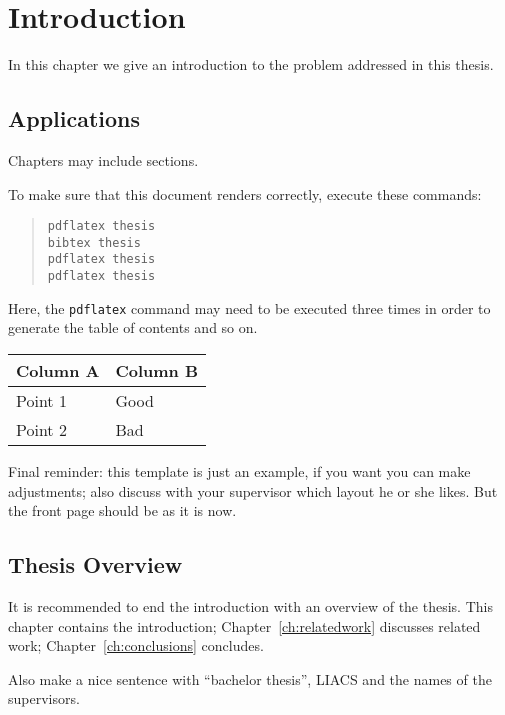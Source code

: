 \chapter{Introduction}\label{ch:introduction}
In this chapter we give an introduction to the problem addressed in this thesis.


\section{Applications}
Chapters may include sections.

To make sure that this document renders correctly, execute these commands:
\begin{quote}
\begin{verbatim}
pdflatex thesis
bibtex thesis
pdflatex thesis
pdflatex thesis
\end{verbatim}
\end{quote}
Here, the \verb|pdflatex| command may need to be executed three times in order to generate the table of contents and so on. 

\begin{figure}
\begin{center}
\end{center}
\end{figure}

\begin{table}
\begin{center}
\begin{tabular}{ll}
Column A & Column B\\
\hline
Point 1 & Good\\
Point 2 & Bad\\
\end{tabular}
\end{center}
\end{table}

Final reminder: this template is just an example, if you want you can make adjustments; also discuss with your supervisor which layout he or she likes. But the front page should be as it is now.

\section{Thesis Overview}
It is recommended to end the introduction with an overview of the thesis. This chapter contains the introduction; Chapter~\ref{ch:relatedwork} discusses related work; Chapter~\ref{ch:conclusions} concludes.

Also make a nice sentence with ``bachelor thesis'', LIACS and the names of the supervisors.

